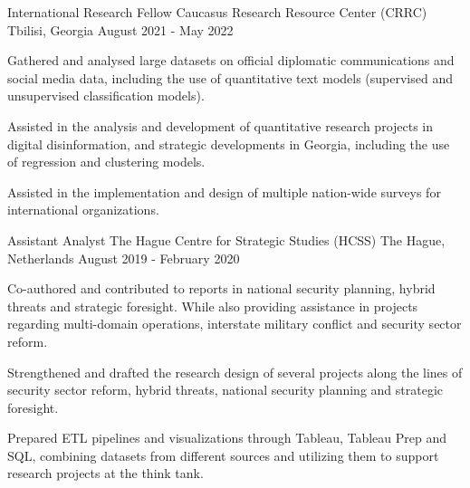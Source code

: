 \begin{cventries}
  \cventry
    {International Research Fellow} %
    {Caucasus Research Resource Center (CRRC)} %
    {Tbilisi, Georgia} %
    {August 2021 - May 2022} %
    {
      \begin{cvitems} %
        \item {Gathered and analysed large datasets on official diplomatic communications and social media data, including the use of quantitative text models (supervised and unsupervised classification models).}
        \item {Assisted in the analysis and development of quantitative research projects in digital disinformation, and strategic developments in Georgia, including the use of regression and clustering models.}
        \item {Assisted in the implementation and design of multiple nation-wide surveys for international organizations.}
      \end{cvitems}
    }

  \cventry
    {Assistant Analyst} %
    {The Hague Centre for Strategic Studies (HCSS)} %
    {The Hague, Netherlands} %
    {August 2019 - February 2020} %
    {
      \begin{cvitems} %
        \item {Co-authored and contributed to reports in national security planning, hybrid threats and strategic foresight. While also providing assistance in projects regarding multi-domain operations, interstate military conflict and security sector reform.}
        \item {Strengthened and drafted the research design of several projects along the lines of security sector reform, hybrid threats, national security planning and strategic foresight.}
        \item {Prepared ETL pipelines and visualizations through Tableau, Tableau Prep and SQL, combining datasets from different sources and utilizing them to support research projects at the think tank.}
      \end{cvitems}
    }

\end{cventries}
